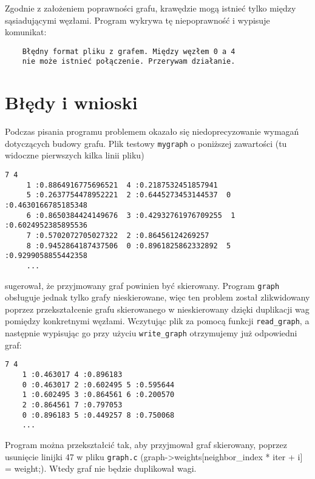 \documentclass[]{article}
\begin{document}
\begin{enumerate}
\begin{figure}
\end{figure}
\newline
Zgodnie z założeniem poprawności grafu, krawędzie mogą istnieć tylko między sąsiadującymi węzłami. Program wykrywa tę niepoprawność i wypisuje komunikat:
\begin{verbatim}
    Błędny format pliku z grafem. Między węzłem 0 a 4 
    nie może istnieć połączenie. Przerywam działanie.
\end{verbatim}

\end{enumerate}

\section{Błędy i wnioski}\label{header-n233}
Podczas pisania programu problemem okazało się niedoprecyzowanie wymagań dotyczących budowy grafu. Plik testowy \texttt{mygraph} o poniższej zawartości (tu widoczne pierwszych kilka linii pliku)
\begin{verbatim}
7 4
	 1 :0.8864916775696521  4 :0.2187532451857941 
	 5 :0.2637754478952221  2 :0.6445273453144537  0 :0.4630166785185348 
	 6 :0.8650384424149676  3 :0.42932761976709255  1 :0.6024952385895536 
	 7 :0.5702072705027322  2 :0.86456124269257 
	 8 :0.9452864187437506  0 :0.8961825862332892  5 :0.9299058855442358 
	 ...
	 \end{verbatim}
sugerował, że przyjmowany graf powinien być skierowany. Program \texttt{graph} obsługuje jednak tylko grafy nieskierowane, więc ten problem został zlikwidowany poprzez przekształcenie grafu skierowanego w nieskierowany dzięki duplikacji wag pomiędzy konkretnymi węzłami. Wczytując plik za pomocą funkcji \texttt{read\_graph}, a następnie wypisując go przy użyciu \texttt{write\_graph} otrzymujemy już odpowiedni graf: 
\bigskip
\begin{verbatim}
7 4
	1 :0.463017 4 :0.896183 
	0 :0.463017 2 :0.602495 5 :0.595644 
	1 :0.602495 3 :0.864561 6 :0.200570 
	2 :0.864561 7 :0.797053 
	0 :0.896183 5 :0.449257 8 :0.750068
	...
\end{verbatim}
Program można przekształcić tak, aby przyjmował graf skierowany, poprzez usunięcie linijki 47 w pliku \texttt{graph.c} (graph->weights[neighbor\_index * iter + i] = weight;). Wtedy graf nie będzie duplikował wagi.
\end{document}

